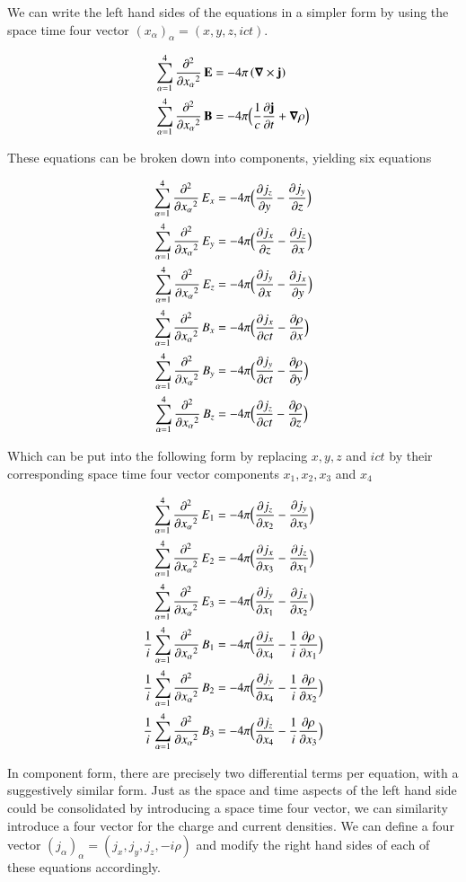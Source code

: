\documentclass{article}      %
\newcommand{\grad}[0]{\boldsymbol{\nabla}}
\newcommand{\curl}[0]{\grad \times}
\newcommand{\delambert}[0]{\sum_{\alpha = 1}^4{\Dsq{x_\alpha}{}}}
\newcommand{\D}[2] {\frac {\partial #2} {\partial #1}}
\newcommand{\Dsq}[2] {\frac {\partial^2 #2} {\partial {#1}^2}}
\newcommand{\Bj}[0]{\mathbf{j}}
\newcommand{\BB}[0]{\mathbf{B}}
\newcommand{\BE}[0]{\mathbf{E}}
\begin{document}
We can write the left hand sides of the equations in a simpler form by using the 
space time four vector $(x_\alpha)_\alpha = (x, y, z, ict)$.

\begin{align*}
\delambert \,\BE &= - 4\pi \left(\curl \Bj\right) \\
\delambert \,\BB &= - 4\pi \Bigl(\frac{1}{c} \D{t}{\Bj} + \grad \rho\Bigr)
\end{align*}

These equations 
can be broken down 
into components, yielding six equations

\begin{align*}
\delambert \,E_x &= - 4\pi \Bigl(\D{y}{j_z} - \D{z}{j_y} \Bigr) \\
\delambert \,E_y &= - 4\pi \Bigl(\D{z}{j_x} - \D{x}{j_z} \Bigr) \\
\delambert \,E_z &= - 4\pi \Bigl(\D{x}{j_y} - \D{y}{j_x} \Bigr) \\
\delambert \,B_x &= - 4\pi \Bigl(\D{ct}{j_x} - \D{x}{\rho} \Bigr)\\
\delambert \,B_y &= - 4\pi \Bigl(\D{ct}{j_y} - \D{y}{\rho} \Bigr)\\
\delambert \,B_z &= - 4\pi \Bigl(\D{ct}{j_z} - \D{z}{\rho} \Bigr)
\end{align*}

Which can be put into the following form by replacing $x, y, z$ and $ict$ by their 
corresponding space time four vector components $x_1, x_2, x_3$ and $x_4$

\begin{align*}
            \delambert \,E_1 &= - 4\pi \Bigl( \D{x_2}{j_z} -             \D{x_3}{j_y} \Bigr) \\
            \delambert \,E_2 &= - 4\pi \Bigl( \D{x_3}{j_x} -             \D{x_1}{j_z} \Bigr) \\
            \delambert \,E_3 &= - 4\pi \Bigl( \D{x_1}{j_y} -             \D{x_2}{j_x} \Bigr) \\
\frac{1}{i} \delambert \,B_1 &= - 4\pi \Bigl( \D{x_4}{j_x} - \frac{1}{i} \D{x_1}{\rho} \Bigr)\\
\frac{1}{i} \delambert \,B_2 &= - 4\pi \Bigl( \D{x_4}{j_y} - \frac{1}{i} \D{x_2}{\rho} \Bigr)\\
\frac{1}{i} \delambert \,B_3 &= - 4\pi \Bigl( \D{x_4}{j_z} - \frac{1}{i} \D{x_3}{\rho} \Bigr)
\end{align*}

In component form,
there are precisely two differential terms per equation, with a suggestively 
similar form.
Just as the space and time aspects of the left hand side could be consolidated
by introducing a space time four vector, we can similarity introduce a four 
vector for the 
charge and current densities.
We can define a four vector $(j_\alpha)_\alpha = 
(j_x, j_y, j_z, -i \rho)$ and modify the right hand sides of each of these equations 
accordingly.
\end{document}
